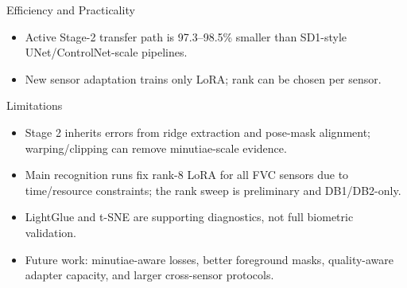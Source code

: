 \documentclass[aspectratio=169,10pt]{beamer}
\begin{document}
\begin{frame}{Efficiency and Practicality}
  \centering
  \vspace{0.9em}
  \begin{itemize}
    \item Active Stage-2 transfer path is 97.3--98.5\% smaller than SD1-style
    UNet/ControlNet-scale pipelines.
    \item New sensor adaptation trains only LoRA; rank can be chosen per sensor.
  \end{itemize}
\end{frame}

\begin{frame}{Limitations}
  \begin{itemize}
    \item Stage 2 inherits errors from ridge extraction and pose-mask alignment;
    warping/clipping can remove minutiae-scale evidence.
    \item Main recognition runs fix rank-8 LoRA for all FVC sensors due to
    time/resource constraints; the rank sweep is preliminary and DB1/DB2-only.
    \item LightGlue and t-SNE are supporting diagnostics, not full biometric
    validation.
    \item Future work: minutiae-aware losses, better foreground masks,
    quality-aware adapter capacity, and larger cross-sensor protocols.
  \end{itemize}
\end{frame}
\end{document}
